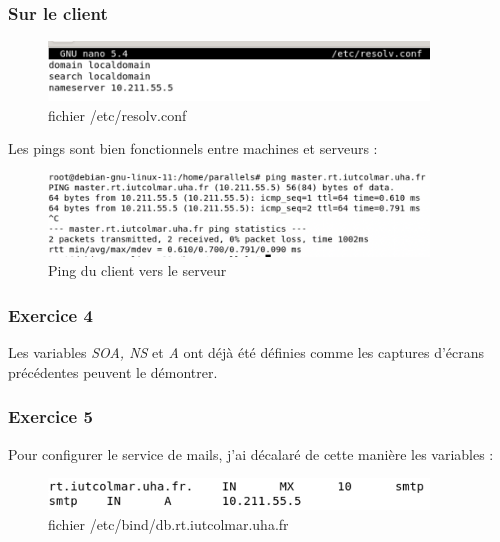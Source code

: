 \documentclass[12pt, a4paper]{article}
\begin{document}
        \subsubsection{Sur le client}
        \begin{figure}[H]
            \centering
            \includegraphics[width=0.9\textwidth]{../img/resolv.png}
            \caption{fichier /etc/resolv.conf}
            \label{fig:resolv}
        \end{figure}
        Les pings sont bien fonctionnels entre machines et serveurs : 
        \begin{figure}[H]
            \centering
            \includegraphics[width=0.9\textwidth]{../img/ping.png}
            \caption{Ping du client vers le serveur}
            \label{fig:ping}
        \end{figure}
      
        \subsubsection{Exercice 4}
        Les variables \textit{SOA, NS} et \textit{A} ont déjà été définies
        comme les captures d'écrans précédentes peuvent le démontrer. 

        \subsubsection{Exercice 5}
        Pour configurer le service de mails, j'ai décalaré de cette manière
        les variables :
        \begin{figure}[H]
            \centering
            \includegraphics[width=0.9\textwidth]{../img/smtp-db.png}
            \caption{fichier /etc/bind/db.rt.iutcolmar.uha.fr}
            \label{fig:smtp-db}
        \end{figure}
\end{document}
